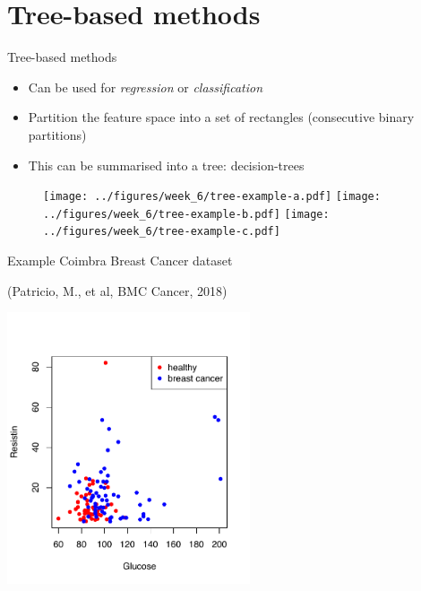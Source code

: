 \documentclass[notes]{beamer}          %
\begin{document}
\section{Tree-based methods}
\begin{frame}{Tree-based methods}
\begin{itemize}
 \item Can be used for \textit{regression} or \textit{classification}
 \item Partition the feature space into a set of rectangles (consecutive binary partitions)
 \item This can be summarised into a tree: decision-trees
 \end{itemize}
 
 \begin{figure}
  \texttt{[image: ../figures/week\_6/tree-example-a.pdf]}  
\endminipage\hfill
{}
  \texttt{[image: ../figures/week\_6/tree-example-b.pdf]}  
\endminipage\hfill
{}%
  \texttt{[image: ../figures/week\_6/tree-example-c.pdf]}  
\endminipage
\end{figure}

\end{frame}



\begin{frame}{Example}
Coimbra Breast Cancer dataset

(Patricio, M., et al, BMC Cancer, 2018)
\vspace{-1cm}
\begin{center}
\includegraphics[height=8cm]{../figures/week_6/breast_cancer_2Dscatterplot.pdf}  
\end{center}
\end{frame}
\end{document}
